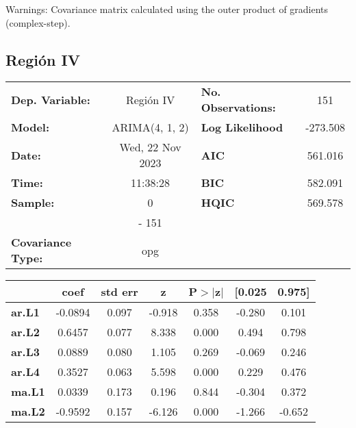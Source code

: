 \documentclass{article}%
\begin{document}
Warnings: \newline
 [1] Covariance matrix calculated using the outer product of gradients (complex-step).%
\subsection*{Región IV}%
\begin{center}
\begin{tabular}{lclc}
\toprule
\textbf{Dep. Variable:}          &    Región IV     & \textbf{  No. Observations:  } &    151      \\
\textbf{Model:}                  &  ARIMA(4, 1, 2)  & \textbf{  Log Likelihood     } &  -273.508   \\
\textbf{Date:}                   & Wed, 22 Nov 2023 & \textbf{  AIC                } &  561.016    \\
\textbf{Time:}                   &     11:38:28     & \textbf{  BIC                } &  582.091    \\
\textbf{Sample:}                 &        0         & \textbf{  HQIC               } &  569.578    \\
\textbf{}                        &       - 151      & \textbf{                     } &             \\
\textbf{Covariance Type:}        &       opg        & \textbf{                     } &             \\
\bottomrule
\end{tabular}
\begin{tabular}{lcccccc}
                & \textbf{coef} & \textbf{std err} & \textbf{z} & \textbf{P$> |$z$|$} & \textbf{[0.025} & \textbf{0.975]}  \\
\midrule
\textbf{ar.L1}  &      -0.0894  &        0.097     &    -0.918  &         0.358        &       -0.280    &        0.101     \\
\textbf{ar.L2}  &       0.6457  &        0.077     &     8.338  &         0.000        &        0.494    &        0.798     \\
\textbf{ar.L3}  &       0.0889  &        0.080     &     1.105  &         0.269        &       -0.069    &        0.246     \\
\textbf{ar.L4}  &       0.3527  &        0.063     &     5.598  &         0.000        &        0.229    &        0.476     \\
\textbf{ma.L1}  &       0.0339  &        0.173     &     0.196  &         0.844        &       -0.304    &        0.372     \\
\textbf{ma.L2}  &      -0.9592  &        0.157     &    -6.126  &         0.000        &       -1.266    &       -0.652     \\

\end{tabular}
\end{center}
\end{document}
